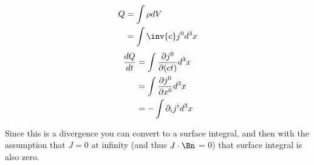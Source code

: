 \documentclass{article}      %
\begin{document}

%
%

\begin{align*}
Q &= \int \rho dV \\
  &= \int \inv{c} j^0 d^3x
\end{align*}
\begin{align*}
\frac{dQ}{dt} 
  &= \int \PD{(ct)}{j^0} d^3x \\
  &= \int \PD{x^0}{j^0} d^3x \\
  &= -\int \partial_i j^i d^3x \\
\end{align*}

Since this is a divergence you can convert to a surface integral, and then with the assumption that $J = 0$ at infinity (and thus $J \cdot \Bn$ = 0) that surface integral is also zero.

\end{document}
